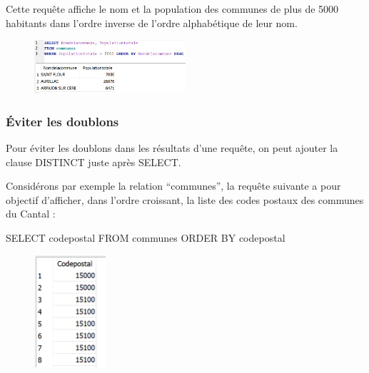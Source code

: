 \documentclass[
  a4paper,
  DIV=11,
  numbers=noendperiod]{scrartcl}
\newenvironment{Shaded}{\begin{snugshade}}{\end{snugshade}}
\newcommand{\KeywordTok}[1]{\textcolor[rgb]{0.00,0.23,0.31}{#1}}
\newcommand{\NormalTok}[1]{\textcolor[rgb]{0.00,0.23,0.31}{#1}}
\begin{document}
Cette requête affiche le nom et la population des communes de plus de
5000 habitants dans l'ordre inverse de l'ordre alphabétique de leur nom.

\begin{figure}

{\centering \includegraphics[width=0.5\textwidth,height=\textheight]{SQL6.png}

}

\end{figure}

\hypertarget{uxe9viter-les-doublons}{%
\subsubsection{Éviter les doublons}\label{uxe9viter-les-doublons}}

Pour éviter les doublons dans les résultats d'une requête, on peut
ajouter la clause DISTINCT juste après SELECT.

Considérons par exemple la relation ``communes'', la requête suivante a
pour objectif d'afficher, dans l'ordre croissant, la liste des codes
postaux des communes du Cantal :

\begin{Shaded}
\begin{Highlighting}[]
\KeywordTok{SELECT}\NormalTok{ codepostal}
\KeywordTok{FROM}\NormalTok{ communes}
\KeywordTok{ORDER} \KeywordTok{BY}\NormalTok{ codepostal}
\end{Highlighting}
\end{Shaded}

\begin{figure}

{\centering \includegraphics[width=1.04167in,height=\textheight]{SQL7.png}

}

\end{figure}
\end{document}
